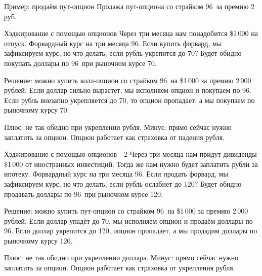 \documentclass{beamer}
\newcommand{\usdrubstrike}{96}
\newcommand{\usdrubaxisspread}{8}
\newcommand{\usdrublow}{70}
\newcommand{\usdrubhigh}{120}
\begin{document}
\begin{frame}{Пример: продаём пут-опцион}
\justifying
Продажа пут-опциона со страйком \usdrubstrike\ за премию 2 руб.

\justifying
\centering
\end{frame}



\begin{frame}{Хэджирование с помощью опционов}
\justify
Через три месяца нам понадобится \$1\,000 на отпуск. Форвардный курс на три месяца \usdrubstrike. Если купить форвард, мы зафиксируем курс, но что делать, если рубль укрепится до \usdrublow? Будет обидно покупать доллары по \usdrubstrike\ при рыночном курсе \usdrublow.

\justify
Решение: можно купить колл-опцион со страйком \usdrubstrike\ на \$1\,000 за премию 2\,000 рублей. Если доллар сильно вырастет, мы исполняем опцион и покупаем по \usdrubstrike. Если рубль внезапно укрепляется до \usdrublow, то опцион пропадает, а мы покупаем по рыночному курсу \usdrublow.

\justify
Плюс: не так обидно при укреплении рубля. Минус: прямо сейчас нужно заплатить за опцион. Опцион работает как страховка от падения рубля.
\end{frame}




\begin{frame}{Хэджирование с помощью опционов - 2}
\justify
Через три месяца нам придут дивиденды \$1\,000 от иностранных инвестиций. Тогда же нам нужно будет заплатить рубли за ипотеку. Форвардный курс на три месяца \usdrubstrike. Если продать форвард, мы зафиксируем курс, но что делать, если рубль ослабнет до \usdrubhigh? Будет обидно продавать доллары по \usdrubstrike\ при рыночном курсе \usdrubhigh.

\justify
Решение: можно купить пут-опцион со страйком \usdrubstrike\ на \$1\,000 за премию 2\,000 рублей. Если доллар упадёт до \usdrublow, мы исполняем опцион и продаём доллары по \usdrubstrike. Если доллар укрепится до \usdrubhigh, опцион пропадает, а мы продадим доллары по рыночному курсу \usdrubhigh.

\justify
Плюс: не так обидно при укреплении доллара. Минус: прямо сейчас нужно заплатить за опцион. Опцион работает как страховка от укрепления рубля.
\end{frame}
\end{document}
